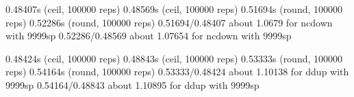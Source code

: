 0.48407s (ceil, 100000 reps)                               0.48569s (ceil, 100000 reps)                              
0.51694s (round, 100000 reps)                              0.52286s (round, 100000 reps)                             
0.51694/0.48407 about 1.0679 for ncdown with 9999sp        0.52286/0.48569 about 1.07654 for ncdown with 9999sp      
                                                                                                                     
0.48424s (ceil, 100000 reps)                               0.48843s (ceil, 100000 reps)                              
0.53333s (round, 100000 reps)                              0.54164s (round, 100000 reps)                             
0.53333/0.48424 about 1.10138 for ddup with 9999sp         0.54164/0.48843 about 1.10895 for ddup with 9999sp        
                                                                                                                     
